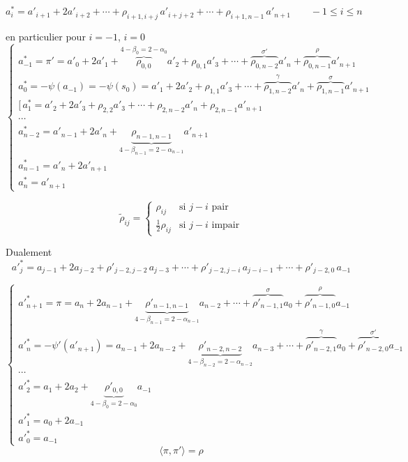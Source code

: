 \documentclass[11pt,a4paper]{article}
\begin{document}
\[
\boxed{a^{*}_i = a'_{i+1} + 2a'_{i+2} + \cdots + \rho_{i+1,i+j}\, a'_{i+j+2} + \cdots
+ \rho_{i+1,n-1}\, a'_{n+1}}
\qquad -1 \leqslant i \leqslant n
\]

 \quad en particulier pour $i = -1$, $i = 0$
\[
\begin{cases}
a^{*}_{-1} = \pi' = a'_0 + 2a'_1 + \overbrace{\rho_{0,0}}^{4 - \beta_0 = 2 - \alpha_0} a'_2
+ \rho_{0,1} a'_3 + \cdots + \overbrace{\rho_{0,n-2}}^{\sigma'} a'_n
+ \overbrace{\rho_{0,n-1}}^{\rho} a'_{n+1} \\
a^{*}_0 = -\psi(a_{-1}) = -\psi(s_0) = a'_1 + 2a'_2 + \rho_{1,1} a'_3 + \cdots
+ \overbrace{\rho_{1,n-2}}^{\gamma} a'_n + \overbrace{\rho_{1,n-1}}^{\sigma} a'_{n+1} \\
\bigl[\, a^{*}_1 = a'_2 + 2a'_3 + \rho_{2,2} a'_3 + \cdots + \rho_{2,n-2} a'_n
+ \rho_{2,n-1} a'_{n+1} \\
\cdots \\
a^{*}_{n-2} = a'_{n-1} + 2a'_n + \underbrace{\rho_{n-1,n-1}}_{4 - \beta_{n-1} = 2 - \alpha_{n-1}} a'_{n+1} \\
a^{*}_{n-1} = a'_n + 2a'_{n+1} \\
a^{*}_n = a'_{n+1}
\end{cases}
\]

\[
\tilde{\rho}_{ij} =
\begin{cases}
\rho_{ij} & \text{si } j - i \text{ pair} \\
\frac{1}{2} \rho_{ij} & \text{si } j - i \text{ impair}
\end{cases}
\]

Dualement
\[
\boxed{a'^{*}_j = a_{j-1} + 2a_{j-2} + \rho'_{j-2,j-2}\, a_{j-3} + \cdots
+ \rho'_{j-2,j-i}\, a_{j-i-1} + \cdots + \rho'_{j-2,0}\, a_{-1}}
\]

\[
\begin{cases}
a'^{*}_{n+1} = \pi = a_n + 2a_{n-1} + \underbrace{\rho'_{n-1,n-1}}_{4 - \beta_{n-1} = 2 - \alpha_{n-1}} a_{n-2}
+ \cdots + \overbrace{\rho'_{n-1,1}}^{\sigma} a_0 + \overbrace{\rho'_{n-1,0}}^{\rho} a_{-1} \\
a'^{*}_n = -\psi'(a'_{n+1}) = a_{n-1} + 2a_{n-2}
+ \underbrace{\rho'_{n-2,n-2}}_{4 - \beta_{n-2} = 2 - \alpha_{n-2}} a_{n-3} + \cdots
+ \overbrace{\rho'_{n-2,1}}^{\gamma} a_0 + \overbrace{\rho'_{n-2,0}}^{\sigma'} a_{-1} \\
\cdots \\
a'^{*}_2 = a_1 + 2a_2 + \underbrace{\rho'_{0,0}}_{4 - \beta_0 = 2 - \alpha_0} a_{-1} \\
a'^{*}_1 = a_0 + 2a_{-1} \\
a'^{*}_0 = a_{-1}
\end{cases}
\]
\[
\boxed{\langle \pi, \pi' \rangle = \rho}
\]
\end{document}
